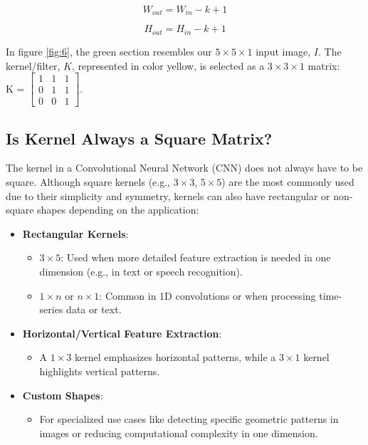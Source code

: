 \begin{equation}
    W_{out} = W_{in} - k +1
    \label{eqn:1}
\end{equation}

\begin{equation}
    H_{out} = H_{in} - k +1
    \label{eqn:2}
\end{equation}

In figure \ref{fig:6}, the green section resembles our $5 \times 5 \times 1$ input image, $I$. The kernel/filter, $K$, represented in color yellow, is selected as a $3 \times 3 \times 1$ matrix:\\

K = $\begin{bmatrix} 1 & 1 & 1\\ 0 & 1 & 1\\ 0 & 0 & 1\end{bmatrix}$.


\subsection{Is Kernel Always a Square Matrix?}
The kernel in a Convolutional Neural Network (CNN) does not always have to be square. Although square kernels (e.g., $3 \times 3$, $5 \times 5$) are the most commonly used due to their simplicity and symmetry, kernels can also have rectangular or non-square shapes depending on the application:
\begin{itemize}
    \item \textbf{Rectangular Kernels}:
    \begin{itemize}
        \item $3 \times 5$: Used when more detailed feature extraction is needed in one dimension (e.g., in text or speech recognition).
        \item $1 \times n$ or $n \times 1$: Common in 1D convolutions or when processing time-series data or text.
    \end{itemize}
    \item \textbf{Horizontal/Vertical Feature Extraction}:
    \begin{itemize}
        \item A $1 \times 3$ kernel emphasizes horizontal patterns, while a $3 \times 1$ kernel highlights vertical patterns.
    \end{itemize}
    \item \textbf{Custom Shapes}:
    \begin{itemize}
        \item For specialized use cases like detecting specific geometric patterns in images or reducing computational complexity in one dimension.
    \end{itemize}
\end{itemize}

